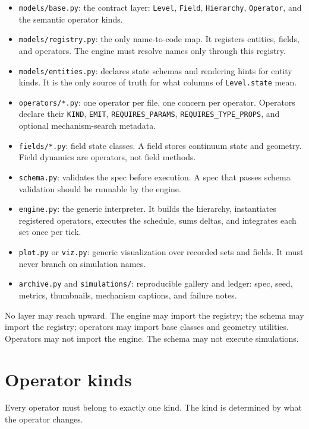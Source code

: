 \documentclass[11pt]{article}
\newcommand{\code}[1]{\texttt{#1}}
\begin{document}
\begin{itemize}\itemsep2pt
\item \code{models/base.py}: the contract layer: \code{Level}, \code{Field},
\code{Hierarchy}, \code{Operator}, and the semantic operator kinds.
\item \code{models/registry.py}: the only name-to-code map. It registers entities,
fields, and operators. The engine must resolve names only through this registry.
\item \code{models/entities.py}: declares state schemas and rendering hints for
entity kinds. It is the only source of truth for what columns of \code{Level.state}
mean.
\item \code{operators/*.py}: one operator per file, one concern per operator.
Operators declare their \code{KIND}, \code{EMIT}, \code{REQUIRES\_PARAMS},
\code{REQUIRES\_TYPE\_PROPS}, and optional mechanism-search metadata.
\item \code{fields/*.py}: field state classes. A field stores continuum state and
geometry. Field dynamics are operators, not field methods.
\item \code{schema.py}: validates the spec before execution. A spec that passes
schema validation should be runnable by the engine.
\item \code{engine.py}: the generic interpreter. It builds the hierarchy,
instantiates registered operators, executes the schedule, sums deltas, and
integrates each set once per tick.
\item \code{plot.py} or \code{viz.py}: generic visualization over recorded sets and
fields. It must never branch on simulation names.
\item \code{archive.py} and \code{simulations/}: reproducible gallery and ledger:
spec, seed, metrics, thumbnails, mechanism captions, and failure notes.
\end{itemize}

No layer may reach upward. The engine may import the registry; the schema may
import the registry; operators may import base classes and geometry utilities.
Operators may not import the engine. The schema may not execute simulations.

\section{Operator kinds}

Every operator must belong to exactly one kind. The kind is determined by what the
operator changes.
\end{document}
